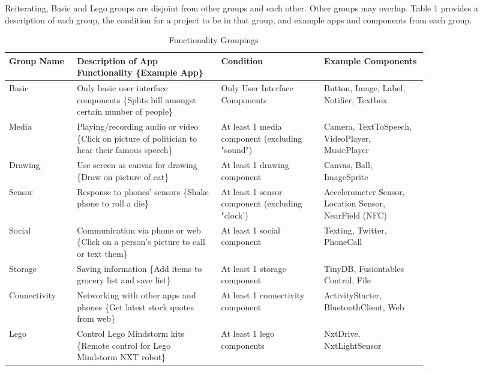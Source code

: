 \documentclass[conference]{IEEEtran}
\begin{document}
Reiterating, Basic and Lego groups are disjoint from other groups and each other. Other groups may overlap. Table 1 provides a description of each group, the condition for a project to be in that group, and example apps and components from each group.

\begin{table}[h!]
\renewcommand{\arraystretch}{1.3}
\caption{Functionality Groupings}
\label{table_groups}
\centering
\begin{tabular}{| p{0.13\linewidth} | p{0.28\linewidth} | p{0.20\linewidth} | p{0.2\linewidth} | }
\hline

Group Name &  Description of App Functionality \{Example App\} & Condition & Example Components\\
\hline
\hline
Basic & Only basic user interface components \{Splits bill amongst certain number of people\} 
 &Only User Interface Components & Button, Image, Label, Notifier, Textbox \\
\hline

Media & Playing/recording audio or video \{Click on picture of politician to hear their famous speech\} & At least 1 media component (excluding "sound") &Camera, TextToSpeech, VideoPlayer, MusicPlayer \\
\hline

Drawing
&Use screen as canvas for drawing \{Draw on picture of cat\}
&At least 1 drawing component
&Canvas, Ball, ImageSprite\\
\hline

Sensor
&Response to phones’ sensors \{Shake phone to roll a die\}
&At least 1 sensor component (excluding "clock')
&Accelerometer Sensor, Location Sensor, NearField (NFC)\\
\hline


Social
&Communication via phone or web \{Click on a person’s picture to call or text them\}
&At least 1 social component
&Texting, Twitter, PhoneCall\\
\hline

Storage
&Saving information \{Add items to grocery list and save list\}
&At least 1 storage component
&TinyDB, Fusiontables Control, File\\
\hline

Connectivity
&Networking with other apps and phones \{Get latest stock quotes from web\}
&At least 1 connectivity component
&ActivityStarter, BluetoothClient, Web\\

\hline
Lego
&Control Lego Mindstorm kits \{Remote control for Lego Mindstorm NXT robot\}
&At least 1 lego components
&NxtDrive, NxtLightSensor\\
\hline

\end{tabular}
\end{table}
\end{document}
